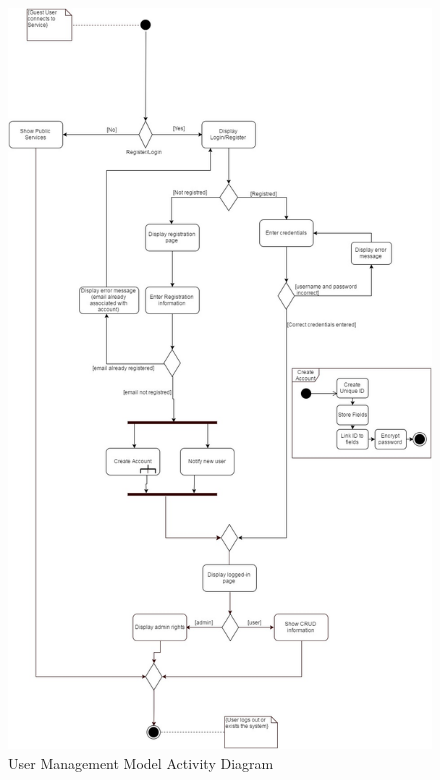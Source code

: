 \documentclass{article}
\begin{document}
      		\begin{figure}[H]
                    \centering \includegraphics[height=0.85\textheight]{UMM-Diagrams/UMM-ActivityDiagram}
                     \caption{User Management Model Activity Diagram}
					 \label{fig:user_activity}
			    \end{figure}
\end{document}
